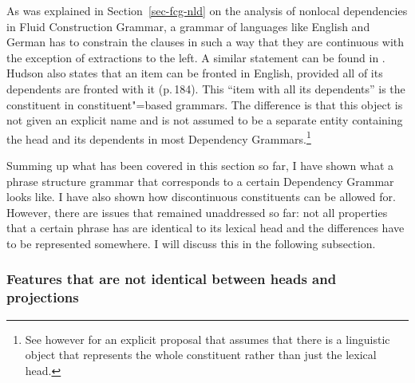 As was explained in Section~\ref{sec-fcg-nld} on the analysis of nonlocal dependencies in Fluid
Construction Grammar\indexfcg, a grammar of languages like English and German has to constrain the clauses in such a way that they are
continuous with the exception of extractions to the left. A similar statement can be found in
. Hudson also states that an item can be fronted in English,
provided all of its dependents are fronted with it (p.\,184). This ``item with all its dependents'' is the
constituent in constituent"=based grammars. The difference is that this object is not given an
explicit name and is not assumed to be a separate entity containing the head and its dependents in
most Dependency Grammars.\footnote{
See however \citet{Hellwig2003a} for an explicit proposal that assumes that there is a linguistic
object that represents the whole constituent rather than just the lexical head.
}

Summing up what has been covered in this section so far, I have shown what a phrase structure
grammar that corresponds to a certain Dependency Grammar looks like. I have also shown how discontinuous
constituents can be allowed for. However, there are issues that remained unaddressed so far: not all
properties that a certain phrase has are identical to its lexical head and the differences have to
be represented somewhere. I will discuss this in the following subsection.

\subsubsection{Features that are not identical between heads and projections}
\label{sec-dg-daughters-mothers}
\label{sec-dg-is-simpler}

